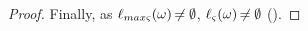 \begin{proof}
Finally, as $\ell_{max\varsigma}(\omega) \not\nobreak\mkern -2mu = \emptyset$, $\ell_\varsigma(\omega) \not\nobreak\mkern -2mu = \emptyset$ ().
\end{proof}



\begin{comment}
Voisinage :
\begin{equation*}
\begin{split}
    V: \wp(\PHproc) \times \segm{1}{k} &\rightarrow \wp(\PHh) \\
    (ps; m) &\mapsto \sfp{\PHh^{(m)+}_{cibles}(ps)}{hs}{\PHh^{(m)+)}_{bonds}(\widehat{B}(hs)) \cup hs)}
  \end{split}
\end{equation*}
where:
\begin{equation*}
\begin{split}
    \widehat{B}: \wp(\PHh) &\rightarrow \wp(\PHproc) \\
    hs &\mapsto \{ \PHhitter(h) \mid h \in hs \} \cup \{ \PHtarget(h) \mid h \in hs \}
  \end{split}
\end{equation*}
\begin{equation*}
\begin{split}
    \PHh^{(m)+}_{\mathsf{ref}}: \wp(\PHproc) &\rightarrow \wp(\PHh) \quad,\quad m \in \segm{0}{k} \text{ and } \mathsf{ref} \in \{ \PHhitter, \PHtarget, \PHbounce \} \\
    ps &\mapsto \{ h \in \PHh \mid \mathsf{ref}(h) \in ps \wedge \prio(h) \leq m \}
  \end{split}
\end{equation*}
\end{comment}



